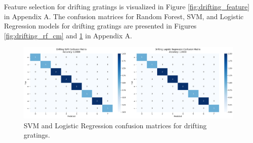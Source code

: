 \documentclass[10pt,twocolumn]{article}
\begin{document}
  Feature selection for drifting gratings is visualized in Figure \ref{fig:drifting_feature} in Appendix A. The confusion matrices for Random Forest, SVM, and Logistic Regression models for drifting gratings are presented in Figures \ref{fig:drifting_rf_cm} and \ref{fig:drifting_svm_logr_cm} in Appendix A.  

\begin{figure}[H]
\centering
\includegraphics[width=\linewidth]{report_images/drifting_SVM_LogR_confusion_matrix.png}
\caption{SVM and Logistic Regression confusion matrices for drifting gratings.}
\label{fig:drifting_svm_logr_cm}
\end{figure}
\end{document}
